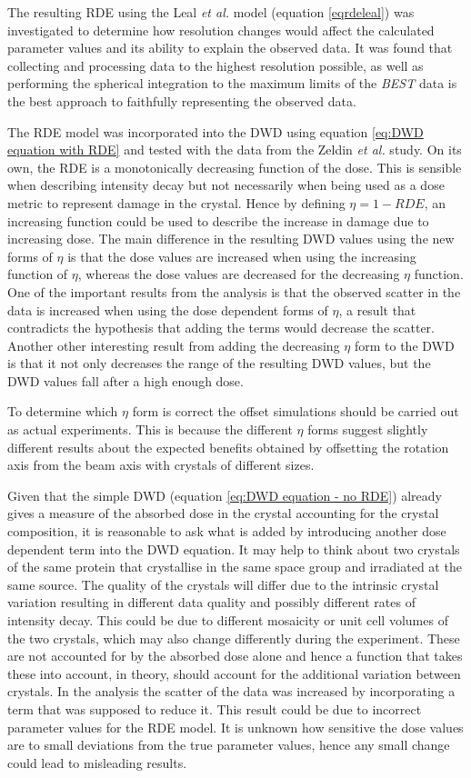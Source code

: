 The resulting RDE using the Leal \textit{et al.}  model (equation \ref{eqrdeleal}) was investigated to determine how resolution changes would affect the calculated parameter values and its ability to explain the observed data.
It was found that collecting and processing data to the highest resolution possible, as well as performing the spherical integration to the maximum limits of the \textit{BEST} data is the best approach to faithfully representing the observed data.

The RDE model was incorporated into the DWD using equation \ref{eq:DWD equation with RDE} and tested with the data from the Zeldin \textit{et al.} study.
On its own, the RDE is a monotonically decreasing function of the dose.
This is sensible when describing intensity decay but not necessarily when being used as a dose metric to represent damage in the crystal.
Hence by defining $\eta = 1 - RDE$, an increasing function could be used to describe the increase in damage due to increasing dose.
The main difference in the resulting DWD values using the new forms of $\eta$ is that the dose values are increased when using the increasing function of $\eta$, whereas the dose values are decreased for the decreasing $\eta$ function.
One of the important results from the analysis is that the observed scatter in the data is increased when using the dose dependent forms of $\eta$, a result that contradicts the hypothesis that adding the terms would decrease the scatter.
Another other interesting result from adding the decreasing $\eta$ form to the DWD is that it not only decreases the range of the resulting DWD values, but the DWD values fall after a high enough dose.

To determine which $\eta$ form is correct the offset simulations should be carried out as actual experiments.
This is because the different $\eta$ forms suggest slightly different results about the expected benefits obtained by offsetting the rotation axis from the beam axis with crystals of different sizes.

Given that the simple DWD (equation \ref{eq:DWD equation - no RDE}) already gives a measure of the absorbed dose in the crystal accounting for the crystal composition, it is reasonable to ask what is added by introducing another dose dependent term into the DWD equation.
It may help to think about two crystals of the same protein that crystallise in the same space group and irradiated at the same source.
The quality of the crystals will differ due to the intrinsic crystal variation resulting in different data quality and possibly different rates of intensity decay.
This could be due to different mosaicity or unit cell volumes of the two crystals, which may also change differently during the experiment.
These are not accounted for by the absorbed dose alone and hence a function that takes these into account, in theory, should account for the additional variation between crystals.
In the analysis the scatter of the data was increased by incorporating a term that was supposed to reduce it.
This result could be due to incorrect parameter values for the RDE model.
It is unknown how sensitive the dose values are to small deviations from the true parameter values, hence any small change could lead to misleading results.

